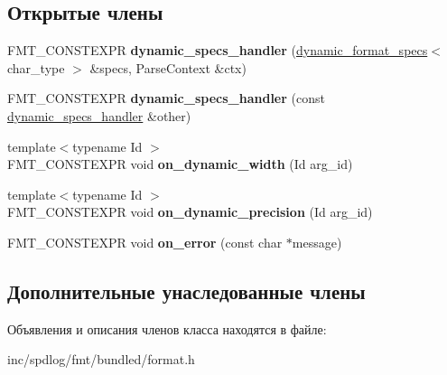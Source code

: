 \subsection*{Открытые члены}
\begin{DoxyCompactItemize}
\item 
\mbox{\label{classinternal_1_1dynamic__specs__handler_af06235807a4b30fb270a920422863768}} 
F\+M\+T\+\_\+\+C\+O\+N\+S\+T\+E\+X\+PR {\bfseries dynamic\+\_\+specs\+\_\+handler} (\hyperlink{structinternal_1_1dynamic__format__specs}{dynamic\+\_\+format\+\_\+specs}$<$ char\+\_\+type $>$ \&specs, Parse\+Context \&ctx)
\item 
\mbox{\label{classinternal_1_1dynamic__specs__handler_a658c0d84c7d999b88ed378016d40f7bf}} 
F\+M\+T\+\_\+\+C\+O\+N\+S\+T\+E\+X\+PR {\bfseries dynamic\+\_\+specs\+\_\+handler} (const \hyperlink{classinternal_1_1dynamic__specs__handler}{dynamic\+\_\+specs\+\_\+handler} \&other)
\item 
\mbox{\label{classinternal_1_1dynamic__specs__handler_a72580d0421bb41d217e49d62953bc799}} 
{\footnotesize template$<$typename Id $>$ }\\F\+M\+T\+\_\+\+C\+O\+N\+S\+T\+E\+X\+PR void {\bfseries on\+\_\+dynamic\+\_\+width} (Id arg\+\_\+id)
\item 
\mbox{\label{classinternal_1_1dynamic__specs__handler_acebee4d5ec383da161be7cd33befbb47}} 
{\footnotesize template$<$typename Id $>$ }\\F\+M\+T\+\_\+\+C\+O\+N\+S\+T\+E\+X\+PR void {\bfseries on\+\_\+dynamic\+\_\+precision} (Id arg\+\_\+id)
\item 
\mbox{\label{classinternal_1_1dynamic__specs__handler_a2da8a7d9ab4c256d6d3dd03eb93a8362}} 
F\+M\+T\+\_\+\+C\+O\+N\+S\+T\+E\+X\+PR void {\bfseries on\+\_\+error} (const char $\ast$message)
\end{DoxyCompactItemize}
\subsection*{Дополнительные унаследованные члены}


Объявления и описания членов класса находятся в файле\+:\begin{DoxyCompactItemize}
\item 
inc/spdlog/fmt/bundled/format.\+h\end{DoxyCompactItemize}
